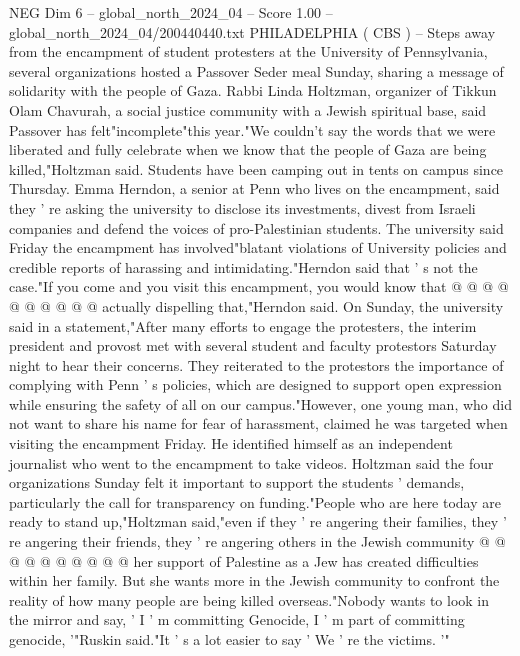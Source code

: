 \begin{textsample}{NEG Dim 6 – global\_north\_2024\_04 – Score 1.00 – global\_north\_2024\_04/200440440.txt}  \label{ex:f6_neg_372}
PHILADELPHIA ( CBS ) -- Steps away from the encampment of student protesters at the University of Pennsylvania, several organizations hosted a Passover Seder meal Sunday, sharing a message of solidarity with the people of Gaza.
Rabbi Linda Holtzman, organizer of Tikkun Olam Chavurah, a social justice community with a Jewish spiritual base, said Passover has felt"incomplete"this year."We couldn't say the words that we were liberated and fully celebrate when we know that the people of Gaza are being killed,"Holtzman said.
Students have been camping out in tents on campus since Thursday.
Emma Herndon, a senior at Penn who lives on the encampment, said they ' re asking the university to disclose its investments, divest from Israeli companies and defend the voices of pro-Palestinian students.
The university said Friday the encampment has involved"blatant violations of University policies and credible reports of harassing and intimidating."Herndon said that ' s not the case."If you come and you visit this encampment, you would know that @ @ @ @ @ @ @ @ @ @ actually dispelling that,"Herndon said.
On Sunday, the university said in a statement,"After many efforts to engage the protesters, the interim president and provost met with several student and faculty protestors Saturday night to hear their concerns.
They reiterated to the protestors the importance of complying with Penn ' s policies, which are designed to support open expression while ensuring the safety of all on our campus."However, one young man, who did not want to share his name for fear of harassment, claimed he was targeted when visiting the encampment Friday.
He identified himself as an independent journalist who went to the encampment to take videos.
Holtzman said the four organizations Sunday felt it important to support the students ' demands, particularly the call for transparency on funding."People who are here today are ready to stand up,"Holtzman said,"even if they ' re angering their families, they ' re angering their friends, they ' re angering others in the Jewish community @ @ @ @ @ @ @ @ @ @ her support of Palestine as a Jew has created difficulties within her family.
But she wants more in the Jewish community to confront the reality of how many people are being killed overseas."Nobody wants to look in the mirror and say, ' I ' m committing Genocide, I ' m part of committing genocide, '"Ruskin said."It ' s a lot easier to say ' We ' re the victims. '"

\end{textsample}
